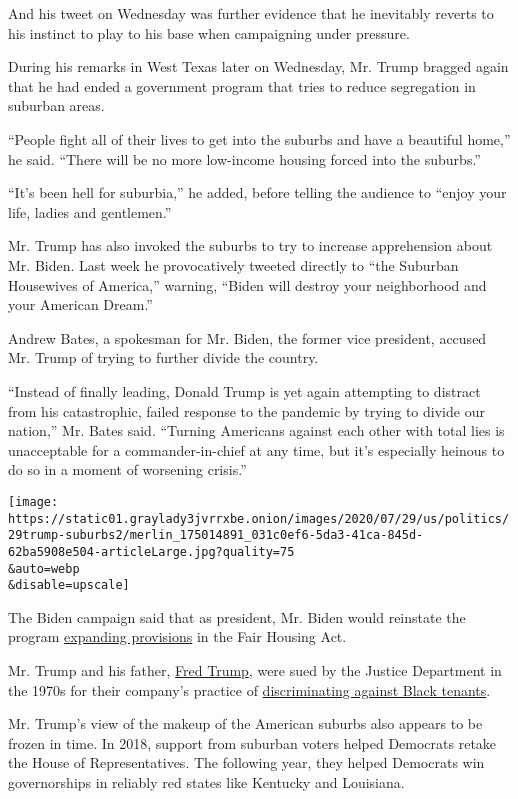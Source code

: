 And his tweet on Wednesday was further evidence that he inevitably
reverts to his instinct to play to his base when campaigning under
pressure.

During his remarks in West Texas later on Wednesday, Mr. Trump bragged
again that he had ended a government program that tries to reduce
segregation in suburban areas.

``People fight all of their lives to get into the suburbs and have a
beautiful home,'' he said. ``There will be no more low-income housing
forced into the suburbs.''

``It's been hell for suburbia,'' he added, before telling the audience
to ``enjoy your life, ladies and gentlemen.''

Mr. Trump has also invoked the suburbs to try to increase apprehension
about Mr. Biden. Last week he provocatively tweeted directly to ``the
Suburban Housewives of America,'' warning, ``Biden will destroy your
neighborhood and your American Dream.''

Andrew Bates, a spokesman for Mr. Biden, the former vice president,
accused Mr. Trump of trying to further divide the country.

``Instead of finally leading, Donald Trump is yet again attempting to
distract from his catastrophic, failed response to the pandemic by
trying to divide our nation,'' Mr. Bates said. ``Turning Americans
against each other with total lies is unacceptable for a
commander-in-chief at any time, but it's especially heinous to do so in
a moment of worsening crisis.''

\texttt{[image: https://static01.graylady3jvrrxbe.onion/images/2020/07/29/us/politics/29trump-suburbs2/merlin\_175014891\_031c0ef6-5da3-41ca-845d-62ba5908e504-articleLarge.jpg?quality=75\\\&auto=webp\\\&disable=upscale]}

The Biden campaign said that as president, Mr. Biden would reinstate the
program
\href{https://www.hud.gov/press/press_releases_media_advisories/HUD_No_20_109}{expanding
provisions} in the Fair Housing Act.

Mr. Trump and his father,
\href{https://www.nytimes3xbfgragh.onion/2020/07/28/us/politics/donald-fred-trump.html?searchResultPosition=1}{Fred
Trump}, were sued by the Justice Department in the 1970s for their
company's practice of
\href{https://www.nytimes3xbfgragh.onion/2016/08/28/us/politics/donald-trump-housing-race.html}{discriminating
against Black tenants}.

Mr. Trump's view of the makeup of the American suburbs also appears to
be frozen in time. In 2018, support from suburban voters helped
Democrats retake the House of Representatives. The following year, they
helped Democrats win governorships in reliably red states like Kentucky
and Louisiana.

